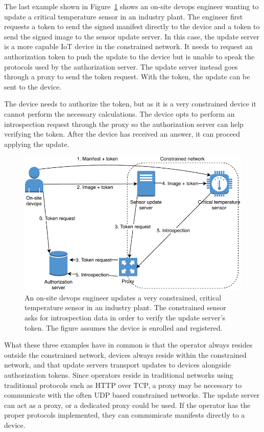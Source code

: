 \documentclass[0-thesis.tex]{subfiles}
\begin{document}
The last example shown in Figure~\ref{fig:industry} shows an on-site devops engineer
wanting to update a critical temperature sensor in an industry plant. The engineer first
requests a token to send the signed manifest directly to the device and a token to send
the signed image to the sensor update server. In this case, the update server is a more
capable IoT device in the constrained network. It needs to request an authorization token
to push the update to the device but is unable to speak the protocols used by the
authorization server. The update server instead goes through a proxy to send the token
request. With the token, the update can be sent to the device.

The device needs to authorize the token, but as it is a very constrained device it cannot
perform the necessary calculations. The device opts to perform an introspection request
through the proxy so the authorization server can help verifying the token. After the
device has received an answer, it can proceed applying the update.

\begin{figure}[t]
    \caption{An on-site devops engineer updates a very constrained, critical temperature
                sensor in an industry plant. The constrained sensor asks for introspection
                data in order to verify the update server's token. The figure assumes the device is enrolled and registered.}
    \label{fig:industry}
    \includegraphics{images/use-case-industry.pdf}
\end{figure}

What these three examples have in common is that the operator always resides outside the
constrained network, devices always reside within the constrained network, and that update
servers transport updates to devices alongside authorization tokens. Since operators
reside in traditional networks using traditional protocols such as HTTP over TCP, a proxy
may be necessary to communicate with the often UDP based constrained networks. The update
server can act as a proxy, or a dedicated proxy could be used. If the operator has the
proper protocols implemented, they can communicate manifests directly to a device.
\end{document}
